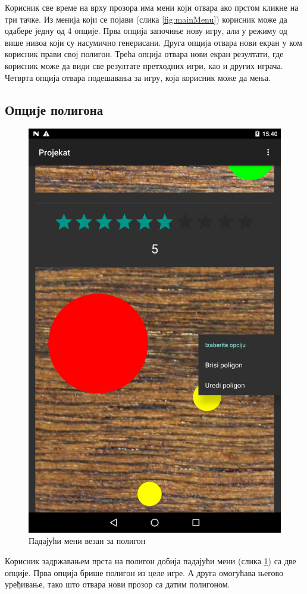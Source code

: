 Корисник све време на врху прозора има мени који отвара ако прстом кликне на три тачке. Из менија који се појави (слика \ref{fig:mainMenu}) корисник може да одабере једну од 4 опције. Прва опција започиње нову игру, али у режиму од више нивоа који су насумично генерисани. Друга опција отвара нови екран у ком корисник прави свој полигон. Трећа опција отвара нови екран резултати, где корисник може да види све резултате претходних игри, као и других играча. Четврта опција отвара подешавања за игру, која корисник може да мења.


\subsection{Опције полигона}
\begin{figure}[htb!]
\begin{center}
\includegraphics[scale=.1]{pictures/main/PolygonMenu}
\caption{Падајући мени везан за полигон}\label{fig:mainPolygonMenu}
\end{center}
\end{figure}
Корисник задржавањем прста на полигон добија падајући мени (слика \ref{fig:mainPolygonMenu}) са две опције. Прва опција брише полигон из целе игре. А друга омогућава његово уређивање, тако што отвара нови прозор са датим полигоном.

